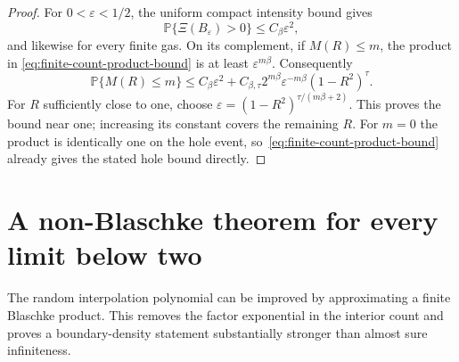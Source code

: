 \documentclass[11pt,a4paper]{article}
\numberwithin{equation}{section}
\theoremstyle{definition}
\theoremstyle{remark}
\begin{document}
\begin{proof}
For $0<\varepsilon<1/2$, the uniform compact intensity bound
gives
\[
 \mathbb P\{\Xi(B_\varepsilon)>0\}\le C_\beta\varepsilon^2,
\]
and likewise for every finite gas. On its complement, if
$M(R)\le m$, the product in
\eqref{eq:finite-count-product-bound} is at least
$\varepsilon^{m\beta}$. Consequently
\[
 \mathbb P\{M(R)\le m\}
 \le C_\beta\varepsilon^2+
 C_{\beta,\tau}2^{m\beta}\varepsilon^{-m\beta}(1-R^2)^\tau.
\]
For $R$ sufficiently close to one, choose
$\varepsilon=(1-R^2)^{\tau/(m\beta+2)}$. This proves the
bound near one; increasing its constant covers the remaining
$R$. For $m=0$ the product is identically one on the hole event,
so~\eqref{eq:finite-count-product-bound} already gives the stated
hole bound directly.
\end{proof}

\section{A non-Blaschke theorem for every limit below two}
\label{sec:non-blaschke-limits}

The random interpolation polynomial can be improved by approximating
a finite Blaschke product. This removes the factor exponential in the
interior count and proves a boundary-density statement substantially
stronger than almost sure infiniteness.
\end{document}
